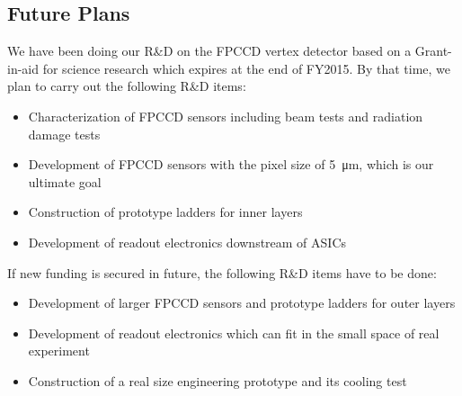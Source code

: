 \subsection{Future Plans}
    We have been doing our R\&D on the FPCCD vertex detector based on a Grant-in-aid for science research which expires at the end of FY2015. By that time, we plan to carry out the following R\&D items:
\begin{itemize}
    \item Characterization of FPCCD sensors including beam tests and radiation damage tests
    \item Development of FPCCD sensors with the pixel size of \SI{5}{\micro\meter}, which is our ultimate goal
    \item Construction of prototype ladders for inner layers
    \item Development of readout electronics downstream of ASICs
\end{itemize}
If new funding is secured in future, the following R\&D items have to be done:
\begin{itemize}
    \item Development of larger FPCCD sensors and prototype ladders for outer layers
    \item Development of readout electronics which can fit in the small space of real experiment
    \item Construction of a real size engineering prototype and its cooling test
\end{itemize}
